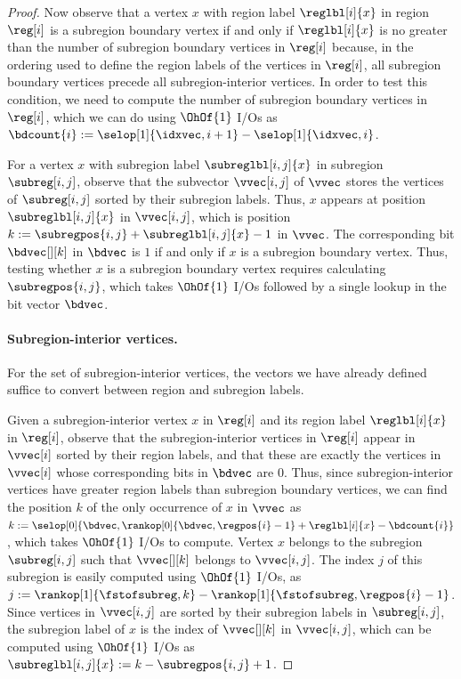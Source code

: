 {\begin{proof}
  Now observe that a vertex $x$ with region label $\reglbl[i]{x}$ in region
  $\reg[i]$ is a subregion boundary vertex if and only if
  $\reglbl[i]{x}$ is no greater than the number of subregion boundary vertices
  in $\reg[i]$ because, in the ordering used to define
  the region labels of the vertices in $\reg[i]$, all subregion boundary
  vertices precede all subregion-interior vertices.
  In order to test this condition, we need to compute the number of subregion
  boundary vertices in $\reg[i]$, which we can do using $\OhOf{1}$ I/Os
  as $\bdcount{i} := \selop[1]{\idxvec,i+1} - \selop[1]{\idxvec,i}$.
 
  For a vertex $x$ with subregion label $\subreglbl[i,j]{x}$ in subregion
  $\subreg[i,j]$, observe that the subvector $\vvec[i,j]$ of $\vvec$
  stores the vertices of $\subreg[i,j]$ sorted by their subregion labels.
  Thus, $x$ appears at position $\subreglbl[i,j]{x}$ in $\vvec[i,j]$,
  which is position $k := \subregpos{i,j} + \subreglbl[i,j]{x} - 1$ in $\vvec$.
  The corresponding bit $\bdvec[][k]$ in $\bdvec$ is $1$ if and only if
  $x$ is a subregion boundary vertex.
  Thus, testing whether $x$ is a subregion boundary vertex requires calculating
  $\subregpos{i,j}$, which takes $\OhOf{1}$ I/Os followed by a single lookup
  in the bit vector $\bdvec$.

  \paragraph{Subregion-interior vertices.}

  For the set of subregion-interior vertices, the vectors we have already
  defined suffice to convert between region
  and subregion labels.

  Given a subregion-interior vertex $x$ in $\reg[i]$ and its region label
  $\reglbl[i]{x}$ in $\reg[i]$, observe that the subregion-interior vertices in
  $\reg[i]$ appear in $\vvec[i]$ sorted by their region labels, and
  that these are exactly the vertices in $\vvec[i]$ whose corresponding
  bits in $\bdvec$ are $0$.
  Thus, since subregion-interior vertices have greater region labels than
  subregion boundary vertices, we can find the position $k$ of the only
  occurrence of $x$ in $\vvec$ as
  $k := \selop[0]{\bdvec, \rankop[0]{\bdvec, \regpos{i} - 1} + \reglbl[i]{x} 
  - \bdcount{i}}$, which takes $\OhOf{1}$ I/Os to compute.
  Vertex $x$ belongs to the subregion $\subreg[i,j]$ such that
  $\vvec[][k]$ belongs to $\vvec[i,j]$.
  The index $j$ of this subregion is easily computed using $\OhOf{1}$ I/Os, as
  $j := \rankop[1]{\fstofsubreg,k} - \rankop[1]{\fstofsubreg,\regpos{i}-1}$.
  Since vertices in $\vvec[i,j]$ are sorted by their subregion labels in
  $\subreg[i,j]$, the subregion label of $x$ is the index of $\vvec[][k]$
  in $\vvec[i,j]$, which can be computed using $\OhOf{1}$ I/Os as
  $\subreglbl[i,j]{x} := k - \subregpos{i,j} + 1$.


\end{proof}}
